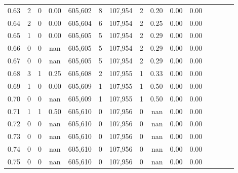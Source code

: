 \begin{tabular}{rrrcrrrrrrrrrrr}
0.63 &       2 &      0 &                                       0.00 &  605,602 &        8 &  107,954 &        2 &  0.20 &  0.00 &                         0.00 \\
0.64 &       2 &      0 &                                       0.00 &  605,604 &        6 &  107,954 &        2 &  0.25 &  0.00 &                         0.00 \\
0.65 &       1 &      0 &                                       0.00 &  605,605 &        5 &  107,954 &        2 &  0.29 &  0.00 &                         0.00 \\
0.66 &       0 &      0 &                                        nan &  605,605 &        5 &  107,954 &        2 &  0.29 &  0.00 &                         0.00 \\
0.67 &       0 &      0 &                                        nan &  605,605 &        5 &  107,954 &        2 &  0.29 &  0.00 &                         0.00 \\
0.68 &       3 &      1 &                                       0.25 &  605,608 &        2 &  107,955 &        1 &  0.33 &  0.00 &                         0.00 \\
0.69 &       1 &      0 &                                       0.00 &  605,609 &        1 &  107,955 &        1 &  0.50 &  0.00 &                         0.00 \\
0.70 &       0 &      0 &                                        nan &  605,609 &        1 &  107,955 &        1 &  0.50 &  0.00 &                         0.00 \\
0.71 &       1 &      1 &                                       0.50 &  605,610 &        0 &  107,956 &        0 &   nan &  0.00 &                         0.00 \\
0.72 &       0 &      0 &                                        nan &  605,610 &        0 &  107,956 &        0 &   nan &  0.00 &                         0.00 \\
0.73 &       0 &      0 &                                        nan &  605,610 &        0 &  107,956 &        0 &   nan &  0.00 &                         0.00 \\
0.74 &       0 &      0 &                                        nan &  605,610 &        0 &  107,956 &        0 &   nan &  0.00 &                         0.00 \\
0.75 &       0 &      0 &                                        nan &  605,610 &        0 &  107,956 &        0 &   nan &  0.00 &                         0.00 \\

\end{tabular}
